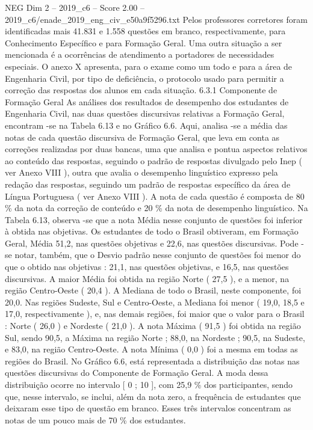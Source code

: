 \begin{textsample}{NEG Dim 2 – 2019\_c6 – Score 2.00 – 2019\_c6/enade\_2019\_eng\_civ\_e50a9f5296.txt}
Pelos professores corretores foram identificadas mais 41.831 e 1.558 questões em branco, respectivamente, para Conhecimento Específico e para Formação Geral.
Uma outra situação a ser mencionada é a ocorrências de atendimento a portadores de necessidades especiais.
O anexo X apresenta, para o exame como um todo e para a área de Engenharia Civil, por tipo de deficiência, o protocolo usado para permitir a correção das respostas dos alunos em cada situação. 6.3.1 Componente de Formação Geral As análises dos resultados de desempenho dos estudantes de Engenharia Civil, nas duas questões discursivas relativas a Formação Geral, encontram -se na Tabela 6.13 e no Gráfico 6.6.
Aqui, analisa -se a média das notas de cada questão discursiva de Formação Geral, que leva em conta as correções realizadas por duas bancas, uma que analisa e pontua aspectos relativos ao conteúdo das respostas, seguindo o padrão de respostas divulgado pelo Inep ( ver Anexo VIII ), outra que avalia o desempenho linguístico expresso pela redação das respostas, seguindo um padrão de respostas específico da área de Língua Portuguesa ( ver Anexo VIII ).
A nota de cada questão é composta de 80 \% da nota da correção de conteúdo e 20 \% da nota de desempenho linguístico.
Na Tabela 6.13, observa -se que a nota Média nesse conjunto de questões foi inferior à obtida nas objetivas.
Os estudantes de todo o Brasil obtiveram, em Formação Geral, Média 51,2, nas questões objetivas e 22,6, nas questões discursivas.
Pode -se notar, também, que o Desvio padrão nesse conjunto de questões foi menor do que o obtido nas objetivas : 21,1, nas questões objetivas, e 16,5, nas questões discursivas.
A maior Média foi obtida na região Norte ( 27,5 ), e a menor, na região Centro-Oeste ( 20,4 ).
A Mediana de todo o Brasil, neste componente, foi 20,0.
Nas regiões Sudeste, Sul e Centro-Oeste, a Mediana foi menor ( 19,0, 18,5 e 17,0, respectivamente ), e, nas demais regiões, foi maior que o valor para o Brasil : Norte ( 26,0 ) e Nordeste ( 21,0 ).
A nota Máxima ( 91,5 ) foi obtida na região Sul, sendo 90,5, a Máxima na região Norte ; 88,0, na Nordeste ; 90,5, na Sudeste, e 83,0, na região Centro-Oeste.
A nota Mínima ( 0,0 ) foi a mesma em todas as regiões do Brasil.
No Gráfico 6.6, está representada a distribuição das notas nas questões discursivas do Componente de Formação Geral.
A moda dessa distribuição ocorre no intervalo [ 0 ; 10 ], com 25,9 \% dos participantes, sendo que, nesse intervalo, se inclui, além da nota zero, a frequência de estudantes que deixaram esse tipo de questão em branco.
Esses três intervalos concentram as notas de um pouco mais de 70 \% dos estudantes.

\end{textsample}
